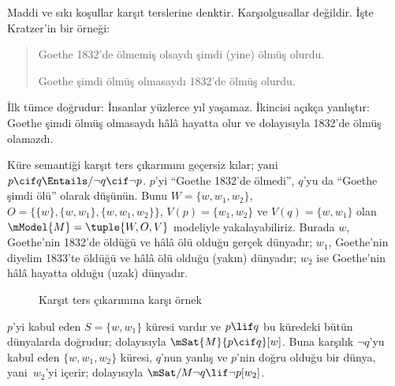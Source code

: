 



Maddi ve sıkı koşullar karşıt terslerine denktir. Karşıolgusallar değildir.
İşte Kratzer'in bir örneği:
\begin{quote}
  Goethe 1832'de ölmemiş olsaydı şimdi (yine) ölmüş olurdu.

  Goethe şimdi ölmüş olmasaydı 1832'de ölmüş olurdu.
\end{quote}
İlk tümce doğrudur: İnsanlar yüzlerce yıl yaşamaz. İkincisi açıkça yanlıştır:
Goethe şimdi ölmüş olmasaydı hâlâ hayatta olur ve dolayısıyla 1832'de ölmüş
olamazdı.

\begin{ex}
  Küre semantiği karşıt ters çıkarımını geçersiz kılar; yani
  $p\cif q\Entails/\lnot q\cif\lnot p$. $p$'yi ``Goethe 1832'de ölmedi'',
  $q$'yu da ``Goethe şimdi ölü'' olarak düşünün. Bunu
  $W=\{w,w_1,w_2\}$, $O=\{\{w\},\{w,w_1\},\{w,w_1,w_2\}\}$,
  $V(p)=\{w_1,w_2\}$ ve $V(q)=\{w,w_1\}$ olan
  $\mModel{M}=\tuple{W,O,V}$ modeliyle yakalayabiliriz. Burada $w$,
  Goethe'nin 1832'de öldüğü ve hâlâ ölü olduğu gerçek dünyadır; $w_1$,
  Goethe'nin diyelim 1833'te öldüğü ve hâlâ ölü olduğu (yakın) dünyadır;
  $w_2$ ise Goethe'nin hâlâ hayatta olduğu (uzak) dünyadır.
\begin{figure}
\begin{center}
\caption{Karşıt ters çıkarımına karşı örnek}
\end{center}
\end{figure}
$p$'yi kabul eden $S=\{w,w_1\}$ küresi vardır ve $p\lif q$ bu küredeki
bütün dünyalarda doğrudur; dolayısıyla $\mSat{M}{p\cif q}[w]$. Buna karşılık
$\lnot q$'yu kabul eden $\{w,w_1,w_2\}$ küresi, $q$'nun yanlış ve $p$'nin
doğru olduğu bir dünya, yani~$w_2$'yi içerir; dolayısıyla
$\mSat/{M}{\lnot q\lif\lnot p}[w_2]$.
\end{ex}

